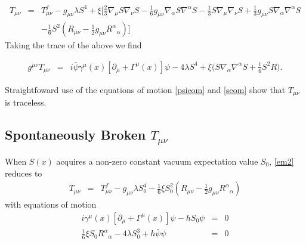 \documentclass[10pt,letterpaper]{article}
\numberwithin{equation}{subsection}
\begin{document}
\begin{eqnarray}
T_{\mu\nu} &=&T_{\mu\nu}^f - g_{\mu\nu} \lambda S^4
+ \xi \bigg[ \frac23 \nabla_\mu S\nabla_\nu S - \frac 16 g_{\mu\nu} \nabla_\alpha S\nabla^\alpha S 
- \frac13 S\nabla_\mu\nabla_\nu S + \frac13 g_{\mu\nu} S \nabla_\alpha\nabla^\alpha S  
\nonumber\\
&& - \frac16 S^2\left( R_{\mu\nu} - \frac12 g_{\mu\nu} R^\alpha{}_\alpha\right)\bigg] 
\label{em2}
\end{eqnarray}
Taking the trace of the above we find

\begin{eqnarray}
g^{\mu\nu}T_{\mu\nu} &=& i\bar\psi \gamma^\mu(x)[\partial_\mu + \Gamma^\mu(x)]\psi -4\lambda S^4
+ \xi \bigg( S\nabla_\alpha\nabla^\alpha S + \frac16 S^2 R\bigg).
\label{em2tr}
\end{eqnarray}

Straightfoward use of the equations of motion \eqref{psieom} and \eqref{seom} show that $T_{\mu\nu}$ is traceless. 


\subsection{Spontaneously Broken $T_{\mu\nu}$}
When $S(x)$ acquires a non-zero constant vacuum expectation value $S_0$, \eqref{em2} reduces to 
\begin{eqnarray}
T_{\mu\nu} &=&T_{\mu\nu}^f - g_{\mu\nu} \lambda S_0^4
 - \frac16 \xi S_0^2\left( R_{\mu\nu} - \frac12 g_{\mu\nu} R^\alpha{}_\alpha\right)
\label{em3}
\end{eqnarray}
with equations of motion
\begin{eqnarray}
i\gamma^\mu(x)[\partial_\mu + \Gamma^\mu(x)]\psi - hS_0\psi &=& 0
\label{psieom2}
\\
\frac16 \xi S_0 R^\alpha{}_\alpha - 4\lambda S_0^3 + h\bar\psi\psi &=& 0
\label{seom2}
\end{eqnarray}

\end{document}
